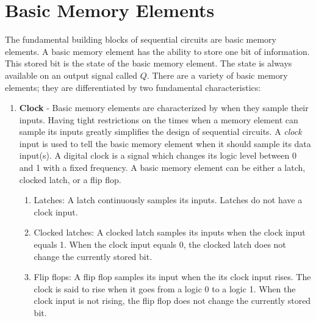 \section{Basic Memory Elements}
The fundamental building blocks of sequential circuits are basic memory
elements.  A basic memory element has the ability to store one bit of
information.  This stored bit is the state of the basic memory element.
The state is always available on an output signal called $Q$.
There are a variety of basic memory elements; they are
differentiated by two fundamental characteristics:
\begin{changemargin}{1.5cm}{1.5cm}
    \begin{enumerate}
        \item \textbf{ Clock} - Basic memory elements are characterized by
            when they sample their inputs.  Having tight restrictions on the
            times when a memory element can sample its inputs greatly
            simplifies the design of sequential circuits.  A \textit{ clock}
            input is used to tell the basic memory element when it should sample
            its data input(s).  A digital clock is a signal which
            changes its logic level between 0 and 1 with a fixed frequency.
            A basic memory element can be either a latch, clocked latch, or
            a flip flop.

            \begin{enumerate}

                \item Latches: A latch continuously samples its inputs.
                    Latches do not have a clock input.

                \item Clocked latches: A clocked latch samples its inputs when
                    the clock input equals 1.  When the clock input equals 0, the
                    clocked latch does not change the currently stored bit.

                \item Flip flops: A flip flop samples its input when the its
                    clock input rises.  The clock is said to rise when it goes
                    from a logic 0 to a logic 1.  When the clock input is not rising,
                    the flip flop does not change the currently stored bit.
            \end{enumerate}


\end{enumerate}
\end{changemargin}
